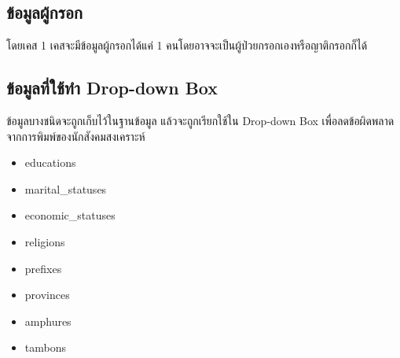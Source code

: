 \subsection{ข้อมูลผู้กรอก}
โดยเคส 1 เคสจะมีข้อมูลผู้กรอกได้แค่ 1 คนโดยอาจจะเป็นผู้ป่วยกรอกเองหรือญาติกรอกก็ได้
\subsection{ข้อมูลที่ใช้ทำ Drop-down Box}
ข้อมูลบางชนิดจะถูกเก็บไว้ในฐานข้อมูล แล้วจะถูกเรียกใช้ใน Drop-down Box เพื่อลดข้อผิดพลาดจากการพิมพ์ของนักสังคมสงเคราะห์
\begin{itemize}
\item educations
\item marital\_statuses
\item economic\_statuses
\item religions
\item prefixes
\item provinces
\item amphures
\item tambons
\end{itemize}